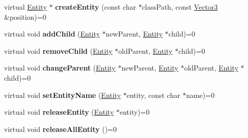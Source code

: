 \begin{DoxyCompactItemize}
\item 
virtual \hyperlink{class_i_dream_sky_1_1_entity}{Entity} $\ast$ {\bfseries create\+Entity} (const char $\ast$class\+Path, const \hyperlink{class_i_dream_sky_1_1_vector3}{Vector3} \&position)=0\hypertarget{class_i_dream_sky_1_1_project_model_base_a4e496a5f566c5a8c1c2f92b3a19d6f8e}{}\label{class_i_dream_sky_1_1_project_model_base_a4e496a5f566c5a8c1c2f92b3a19d6f8e}

\item 
virtual void {\bfseries add\+Child} (\hyperlink{class_i_dream_sky_1_1_entity}{Entity} $\ast$new\+Parent, \hyperlink{class_i_dream_sky_1_1_entity}{Entity} $\ast$child)=0\hypertarget{class_i_dream_sky_1_1_project_model_base_a4144362d7431aa4beffb320ae6cc5744}{}\label{class_i_dream_sky_1_1_project_model_base_a4144362d7431aa4beffb320ae6cc5744}

\item 
virtual void {\bfseries remove\+Child} (\hyperlink{class_i_dream_sky_1_1_entity}{Entity} $\ast$old\+Parent, \hyperlink{class_i_dream_sky_1_1_entity}{Entity} $\ast$child)=0\hypertarget{class_i_dream_sky_1_1_project_model_base_ac894d315c85824d0c047fdb572ea8a75}{}\label{class_i_dream_sky_1_1_project_model_base_ac894d315c85824d0c047fdb572ea8a75}

\item 
virtual void {\bfseries change\+Parent} (\hyperlink{class_i_dream_sky_1_1_entity}{Entity} $\ast$new\+Parent, \hyperlink{class_i_dream_sky_1_1_entity}{Entity} $\ast$old\+Parent, \hyperlink{class_i_dream_sky_1_1_entity}{Entity} $\ast$child)=0\hypertarget{class_i_dream_sky_1_1_project_model_base_a0108093cacab738e472cb20ec6a99f84}{}\label{class_i_dream_sky_1_1_project_model_base_a0108093cacab738e472cb20ec6a99f84}

\item 
virtual void {\bfseries set\+Entity\+Name} (\hyperlink{class_i_dream_sky_1_1_entity}{Entity} $\ast$entity, const char $\ast$name)=0\hypertarget{class_i_dream_sky_1_1_project_model_base_a1ea400f6406d1c95321054e6f7bb7d8e}{}\label{class_i_dream_sky_1_1_project_model_base_a1ea400f6406d1c95321054e6f7bb7d8e}

\item 
virtual void {\bfseries release\+Entity} (\hyperlink{class_i_dream_sky_1_1_entity}{Entity} $\ast$entity)=0\hypertarget{class_i_dream_sky_1_1_project_model_base_a06cb26db917f11144d21a281873259d1}{}\label{class_i_dream_sky_1_1_project_model_base_a06cb26db917f11144d21a281873259d1}

\item 
virtual void {\bfseries release\+All\+Entity} ()=0\hypertarget{class_i_dream_sky_1_1_project_model_base_ab4535142a5e130a04876dbd6d5487aca}{}\label{class_i_dream_sky_1_1_project_model_base_ab4535142a5e130a04876dbd6d5487aca}


\end{DoxyCompactItemize}
